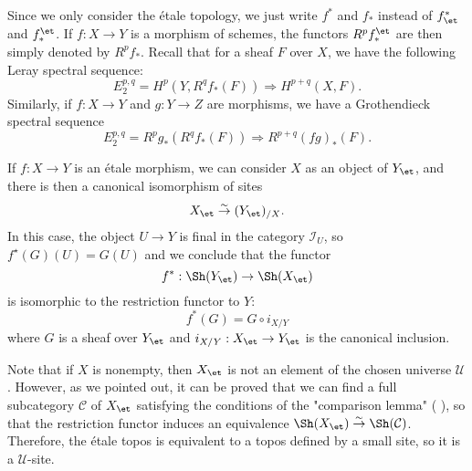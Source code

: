 Since we only consider the \'etale topology, we just write $f^*$ and $f_*$ instead of $f^*_\et$ and $f_*^\et$. If $f:X\to Y$ is a morphism of schemes, the functors $R^pf_*^\et$ are then simply denoted by $R^pf_*$. Recall that for a sheaf $F$ over $X$, we have the following Leray spectral sequence:
\[E_2^{p,q}=H^p(Y,R^qf_*(F))\Rightarrow H^{p+q}(X,F).\]
Similarly, if $f:X\to Y$ and $g:Y\to Z$ are morphisms, we have a Grothendieck spectral sequence
\[E_2^{p,q}=R^pg_*(R^qf_*(F))\Rightarrow R^{p+q}(fg)_*(F).\]

\begin{example}\label{scheme etale morphism inverse image functor expression}
If $f:X\to Y$ is an \'etale morphism, we can consider $X$ as an object of $Y_\et$, and there is then a canonical isomorphism of sites
\[X_\et\stackrel{\sim}{\to}(Y_\et)_{/X}.\]
In this case, the object $U\to Y$ is final in the category $\mathcal{I}_U$, so $f^\star(G)(U)=G(U)$ and we conclude that the functor
\[f^*:\Sh(Y_\et)\to\Sh(X_\et)\]
is isomorphic to the restriction functor to $Y$:
\begin{equation}\label{scheme etale morphism inverse image functor expression-1}
f^*(G)=G\circ i_{X/Y}
\end{equation}
where $G$ is a sheaf over $Y_\et$ and $i_{X/Y}:X_\et\to Y_\et$ is the canonical inclusion.
\end{example}

\begin{remark}
Note that if $X$ is nonempty, then $X_\et$ is not an element of the chosen universe $\mathscr{U}$. However, as we pointed out, it can be proved that we can find a full subcategory $\mathcal{C}$ of $X_\et$ satisfying the conditions of the "comparison lemma" (\cite{SGA4-1} ), so that the restriction functor induces an equivalence $\Sh(X_\et)\stackrel{\sim}{\to}\Sh(\mathcal{C})$. Therefore, the \'etale topos is equivalent to a topos defined by a small site, so it is a $\mathscr{U}$-site.
\end{remark}

